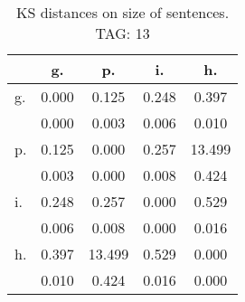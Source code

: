 \begin{table}[h!]
\begin{center}
\begin{tabular}{| l | c | c | c | c |}\hline
 & g. & p. & i. & h. \\\hline
g. & 0.000  & 0.125  & 0.248  & 0.397 \\\hline
 & 0.000  & 0.003  & 0.006  & 0.010 \\\hline
p. & 0.125  & 0.000  & 0.257  & 13.499 \\\hline
 & 0.003  & 0.000  & 0.008  & 0.424 \\\hline
i. & 0.248  & 0.257  & 0.000  & 0.529 \\\hline
 & 0.006  & 0.008  & 0.000  & 0.016 \\\hline
h. & 0.397  & 13.499  & 0.529  & 0.000 \\\hline
 & 0.010  & 0.424  & 0.016  & 0.000 \\\hline
\end{tabular}
\caption{KS distances on size of sentences. TAG: 13}
\end{center}
\end{table}